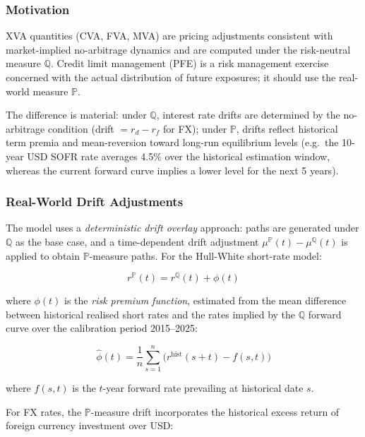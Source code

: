 \documentclass[11pt,a4paper]{article}
\begin{document}
\subsubsection{Motivation}

XVA quantities (CVA, FVA, MVA) are pricing adjustments consistent with
market-implied no-arbitrage dynamics and are computed under the risk-neutral
measure $\mathbb{Q}$. Credit limit management (PFE) is a risk management
exercise concerned with the actual distribution of future exposures; it should
use the real-world measure $\mathbb{P}$.

The difference is material: under $\mathbb{Q}$, interest rate drifts are
determined by the no-arbitrage condition (drift $= r_d - r_f$ for FX); under
$\mathbb{P}$, drifts reflect historical term premia and mean-reversion toward
long-run equilibrium levels (e.g.\ the 10-year USD SOFR rate averages 4.5\%
over the historical estimation window, whereas the current forward curve
implies a lower level for the next 5 years).

\subsubsection{Real-World Drift Adjustments}

The model uses a \emph{deterministic drift overlay} approach: paths are
generated under $\mathbb{Q}$ as the base case, and a time-dependent drift
adjustment $\mu^{\mathbb{P}}(t) - \mu^{\mathbb{Q}}(t)$ is applied to
obtain $\mathbb{P}$-measure paths. For the Hull-White short-rate model:

\begin{equation}
  r^{\mathbb{P}}(t) = r^{\mathbb{Q}}(t) + \phi(t)
  \label{eq:rw_adjust}
\end{equation}

where $\phi(t)$ is the \emph{risk premium function}, estimated from the
mean difference between historical realised short rates and the rates implied
by the $\mathbb{Q}$ forward curve over the calibration period 2015--2025:

\begin{equation}
  \hat{\phi}(t) = \frac{1}{n}\sum_{s=1}^{n} \bigl(r^{\text{hist}}(s+t) - f(s, t)\bigr)
  \label{eq:phi_est}
\end{equation}

where $f(s, t)$ is the $t$-year forward rate prevailing at historical date $s$.

For FX rates, the $\mathbb{P}$-measure drift incorporates the historical
excess return of foreign currency investment over USD:
\end{document}
